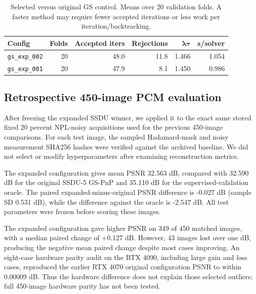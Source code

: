 \documentclass[10pt,a4paper]{article}
\begin{document}
\begin{table}[htbp]
\centering\small
\begin{tabular}{@{}lrrrrr@{}}
\toprule
\textbf{Config}&\textbf{Folds}&\textbf{Accepted iters}&
\textbf{Rejections}&$\boldsymbol{\lambda\tau}$&\textbf{s/solver}\\
\midrule
\texttt{gs\_exp\_002} & 20 & 48.0 & 11.8 & 1.466 & 1.054 \\
\texttt{gs\_exp\_001} & 20 & 47.9 & 8.1 & 1.450 & 0.986 \\
\bottomrule
\end{tabular}
\caption{Selected versus original GS control. Means over 20 validation folds.
A faster method may require fewer accepted iterations or less work
per iteration/backtracking.}
\end{table}

\clearpage
\subsection*{Retrospective 450-image PCM evaluation}
After freezing the expanded SSDU winner, we applied it to the
exact same stored fixed 20 percent NPL-noisy acquisitions used
for the previous 450-image comparisons.
For each test image, the sampled Hadamard-mask and noisy
measurement SHA256 hashes were verified against the archived
baseline. We did not select or modify hyperparameters after
examining reconstruction metrics.

The expanded configuration gives mean PSNR 32.563 dB, compared with 32.590 dB for the original SSDU-5 GS-PnP and 35.110 dB for the supervised-validation oracle. The paired expanded-minus-original PSNR difference is -0.027 dB (sample SD 0.531 dB), while the difference against the oracle is -2.547 dB. All test parameters were frozen before scoring these images.

The expanded configuration gave higher PSNR on 349 of 450 matched images, with a median paired change of +0.127 dB. However, 43 images lost over one dB, producing the negative mean paired change despite most cases improving. An eight-case hardware parity audit on the RTX 4090, including large gain and loss cases, reproduced the earlier RTX 4070 original configuration PSNR to within 0.00009 dB. Thus the hardware difference does not explain those selected outliers; full 450-image hardware parity has not been tested.
\end{document}
